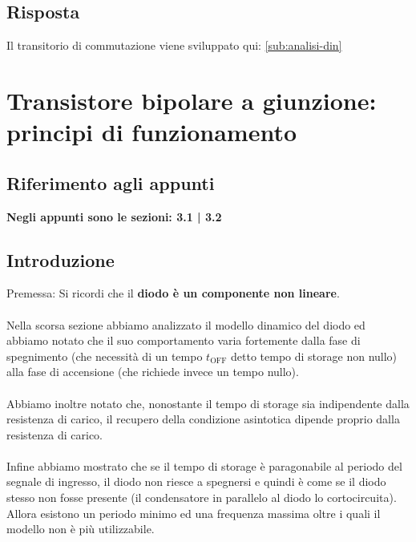 \documentclass{article}
\numberwithin{equation}{subsection}
\begin{document}
	\subsection{Risposta}
	Il transitorio di commutazione viene sviluppato qui: \ref{sub:analisi-din}
	\section{Transistore bipolare a giunzione: principi di funzionamento}
	\subsection{Riferimento agli appunti}
	\textbf{Negli appunti sono le sezioni: 3.1 | 3.2}
	\subsection{Introduzione}
	Premessa: Si ricordi che il \textbf{diodo è un componente non lineare}.\\\\
	Nella scorsa sezione abbiamo analizzato il modello dinamico del diodo ed abbiamo notato che il suo comportamento varia fortemente dalla fase di spegnimento (che necessità di un tempo $t_{\text{OFF}}$ detto tempo di storage non nullo) alla fase di accensione (che richiede invece un tempo nullo).\\\\
	Abbiamo inoltre notato che, nonostante il tempo di storage sia indipendente dalla resistenza di carico, il recupero della condizione asintotica dipende proprio dalla resistenza di carico.\\\\
	Infine abbiamo mostrato che se il tempo di storage è paragonabile al periodo del segnale di ingresso, il diodo non riesce a spegnersi e quindi è come se il diodo stesso non fosse presente (il condensatore in parallelo al diodo lo cortocircuita). \\
	Allora esistono un periodo minimo ed una frequenza massima oltre i quali il modello non è più utilizzabile.
\end{document}
